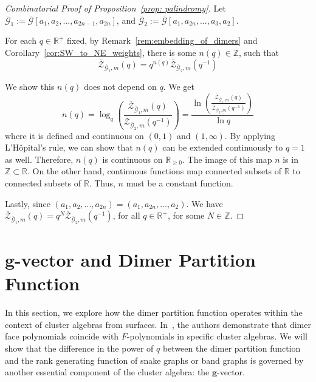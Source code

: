\documentclass[11pt]{amsart}
\theoremstyle{definition}
\theoremstyle{remark}
\numberwithin{equation}{section}
\begin{document}
\begin{proof}[Combinatorial Proof of Proposition~\ref{prop: palindromy}]
    Let $\overline{\mathcal{G}}_1:=\overline{\mathcal{G}}[a_1,a_2,...,a_{2n-1},a_{2n}]$, and $\overline{\mathcal{G}}_2:=\overline{\mathcal{G}}[a_1,a_{2n},...,a_{3},a_{2}]$.

For each $q\in\mathbb{R}^+$ fixed, by Remark~\ref{rem:embedding_of_dimers} and Corollary~\ref{cor:SW_to_NE_weights}, there is some $n(q)\in \mathbb{Z}$, such that
\begin{equation}
    \overline{\mathcal{Z}}_{\overline{\mathcal{G}}_1,m}(q) = q^{n(q)}\overline{\mathcal{Z}}_{\overline{\mathcal{G}}_2,m}(q^{-1})
\end{equation}

We show this $n(q)$ does not depend on $q$. We get
\[n(q) = \log_q\left(\frac{\overline{\mathcal{Z}}_{\overline{\mathcal{G}}_1,m}(q)}{\overline{\mathcal{Z}}_{\overline{\mathcal{G}}_2,m}(q^{-1})}\right)=\frac{\ln\left(\frac{\overline{\mathcal{Z}}_{\overline{\mathcal{G}}_1,m}(q)}{\overline{\mathcal{Z}}_{\overline{\mathcal{G}}_2,m}(q^{-1})}\right)}{\ln{q}}\]
where it is defined and continuous on $(0,1)$ and $(1,\infty)$. By applying L'Hôpital's rule, we can show that $n(q)$ can be extended continuously to $q=1$ as well. Therefore, $n(q)$ is continuous on $\mathbb{R}_{\geq0}$. The image of this map $n$ is in $\mathbb{Z}\subset \mathbb{R}$. On the other hand, continuous functions map connected subsets of $\mathbb{R}$ to connected subsets of $\mathbb{R}$. Thus, $n$ must be a constant function.

Lastly, since $(a_1,a_2,...,a_{2n}) = (a_1,a_{2n},...,a_{2})$. We have $\overline{\mathcal{Z}}_{\overline{\mathcal{G}}_1,m}(q) = q^{N}\overline{\mathcal{Z}}_{\overline{\mathcal{G}}_2,m}(q^{-1})$, for all $q\in \mathbb{R}^+$, for some $N\in \mathbb{Z}$.
\end{proof}

\section{$\mathbf{g}$-vector and Dimer Partition Function}\label{sec: connections_to_cluster}

In this section, we explore how the dimer partition function operates within the context of cluster algebras from surfaces. In~\cite{MMSV24}, the authors demonstrate that dimer face polynomials coincide with $F$-polynomials in specific cluster algebras. We will show that the difference in the power of $q$ between the dimer partition function and the rank generating function of snake graphs or band graphs is governed by another essential component of the cluster algebra: the $\mathbf{g}$-vector.
\end{document}
